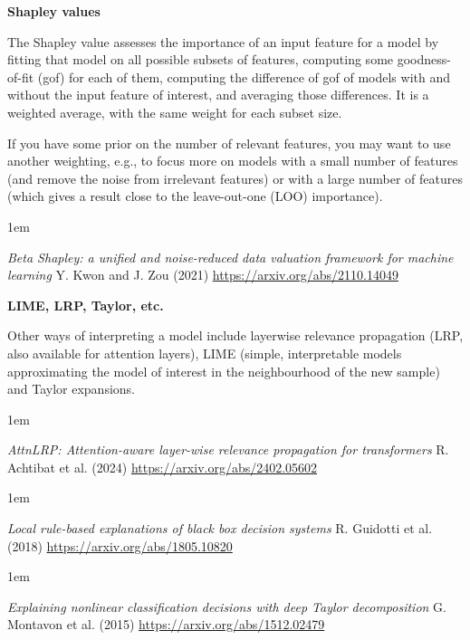\documentclass[a5paper]{article}
\newenvironment{reference}{%
  \medskip\goodbreak
  \parskip 0pt
  \raggedright
  \leftskip 1em
  \obeylines
}{\par\medskip\goodbreak}
\def\subsection#1{{\par\bigskip\goodbreak\large\bfseries #1\par}}
\begin{document}
\subsection{Shapley values}

The Shapley value assesses the importance of an input feature for a model
by fitting that model on all possible subsets of features,
computing some goodness-of-fit (gof) for each of them,
computing the difference of gof of models with and without the input feature of interest,
and averaging those differences.
It is a weighted average, with the same weight for each subset size.

If you have some prior on the number of relevant features,
you may want to use another weighting, e.g.,
to focus more on models with a small number of features (and remove the noise from irrelevant features)
or with a large number of features (which gives a result close to the leave-out-one (LOO) importance).

\begin{reference}
  \emph{Beta Shapley: a unified and noise-reduced data valuation framework for machine learning}
  Y. Kwon and J. Zou (2021)
  \url{https://arxiv.org/abs/2110.14049}
\end{reference}

\subsection{LIME, LRP, Taylor, etc.}

Other ways of interpreting a model include
layerwise relevance propagation (LRP, also available for attention layers),
LIME (simple, interpretable models approximating the model of interest
in the neighbourhood of the new sample)
and Taylor expansions.

\begin{reference}
  \emph{AttnLRP: Attention-aware layer-wise relevance propagation for transformers}
  R. Achtibat et al. (2024)
  \url{https://arxiv.org/abs/2402.05602}
\end{reference}

\begin{reference}
  \emph{Local rule-based explanations  of black box decision systems}
  R. Guidotti et al. (2018)
  \url{https://arxiv.org/abs/1805.10820}
\end{reference}

\begin{reference}
  \emph{Explaining nonlinear classification decisions with deep Taylor decomposition}
  G. Montavon et al. (2015)
  \url{https://arxiv.org/abs/1512.02479}
\end{reference}
\end{document}

